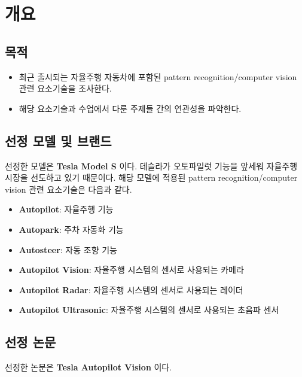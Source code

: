 \section{개요}{\label{sec:intro}}

\subsection{목적}
\begin{itemize}\tightlist
    \item 최근 출시되는 자율주행 자동차에 포함된 pattern recognition/computer vision 관련 요소기술을 조사한다.
    \item 해당 요소기술과 수업에서 다룬 주제들 간의 연관성을 파악한다.
\end{itemize}

\subsection{선정 모델 및 브랜드}
선정한 모델은 \textbf{Tesla Model S} 이다.
테슬라가 오토파일럿 기능을 앞세워 자율주행 시장을 선도하고 있기 때문이다.
해당 모델에 적용된 pattern recognition/computer vision 관련 요소기술은 다음과 같다.
\begin{itemize}\tightlist
    \item \textbf{Autopilot}: 자율주행 기능
    \item \textbf{Autopark}: 주차 자동화 기능
    \item \textbf{Autosteer}: 자동 조향 기능
    \item \textbf{Autopilot Vision}: 자율주행 시스템의 센서로 사용되는 카메라
    \item \textbf{Autopilot Radar}: 자율주행 시스템의 센서로 사용되는 레이더
    \item \textbf{Autopilot Ultrasonic}: 자율주행 시스템의 센서로 사용되는 초음파 센서
\end{itemize}

\subsection{선정 논문}
선정한 논문은 \textbf{Tesla Autopilot Vision} 이다.